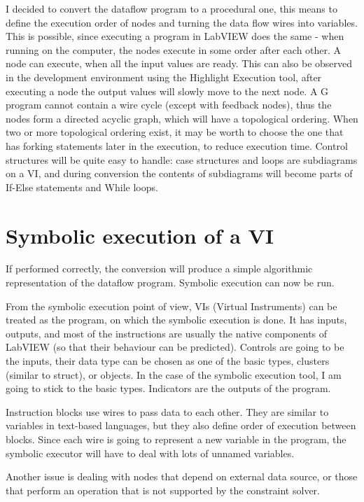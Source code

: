 I decided to convert the dataflow program to a procedural one, this means to define the execution order of nodes and turning the data flow wires into variables. This is possible, since executing a program in LabVIEW does the same - when running on the computer, the nodes execute in some order after each other. A node can execute, when all the input values are ready. This can also be observed in the development environment using the Highlight Execution tool, after executing a node the output values will slowly move to the next node. A G program cannot contain a wire cycle (except with feedback nodes), thus the nodes form a directed acyclic graph, which will have a topological ordering. When two or more topological ordering exist, it may be worth to choose the one that has forking statements later in the execution, to reduce execution time. Control structures will be quite easy to handle: case structures and loops are subdiagrams on a VI, and during conversion the contents of subdiagrams will become parts of If-Else statements and While loops. 

\section{Symbolic execution of a VI}

If performed correctly, the conversion will produce a simple algorithmic representation of the dataflow program. Symbolic execution can now be run.

From the symbolic execution point of view, VIs (Virtual Instruments) can be treated as the program, on which the symbolic execution is done. It has inputs, outputs, and most of the instructions are usually the native components of LabVIEW (so that their behaviour can be predicted). Controls are going to be the inputs, their data type can be chosen as one of the basic types, clusters (similar to struct), or objects. In the case of the symbolic execution tool, I am going to stick to the basic types. Indicators are the outputs of the program.

Instruction blocks use wires to pass data to each other. They are similar to variables in text-based languages, but they also define order of execution between blocks. Since each wire is going to represent a new variable in the program, the symbolic executor will have to deal with lots of unnamed variables.

Another issue is dealing with nodes that depend on external data source, or those that perform an operation that is not supported by the constraint solver.

